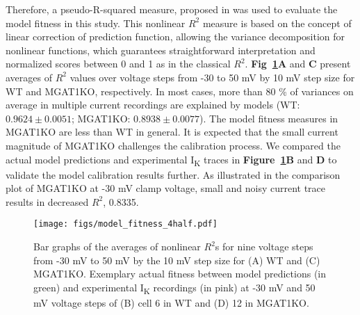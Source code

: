 \documentclass[11pt]{article}
\begin{document}
Therefore, a pseudo-R-squared measure, proposed in \citet{li2019prediction} was used to evaluate the model fitness in this study. This nonlinear $R^{2}$ measure is based on the concept of linear correction of prediction function, allowing the variance decomposition for nonlinear functions, which guarantees straightforward interpretation and normalized scores between 0 and 1 as in the classical $R^{2}$. \textbf{Fig~\ref{fig:model_fitness}A} and \textbf{C} present averages of $R^{2}$ values over voltage steps from -30 to 50 mV by 10 mV step size for WT and MGAT1KO, respectively. In most cases, more than 80 \% of variances on average in multiple current recordings are explained by models (WT: $0.9624 \pm 0.0051$; MGAT1KO: $0.8938 \pm 0.0077$). The model fitness measures in MGAT1KO are less than WT in general. It is expected that the small current magnitude of MGAT1KO challenges the calibration process. We compared the actual model predictions and experimental I\textsubscript{K} traces in \textbf{Figure~\ref{fig:model_fitness}B} and \textbf{D} to validate the model calibration results further. As illustrated in the comparison plot of MGAT1KO at -30 mV clamp voltage, small and noisy current trace results in decreased $R^{2}$, 0.8335. 
\begin{figure}[!ht]
    \centering
    \texttt{[image: figs/model\_fitness\_4half.pdf]}
    \caption{Bar graphs of the averages of nonlinear $R^{2}$s for nine voltage steps from -30 mV to 50 mV by the 10 mV step size for (A) WT and (C) MGAT1KO. Exemplary actual fitness between model predictions (in green) and experimental I\textsubscript{K} recordings (in pink) at -30 mV and 50 mV voltage steps of (B) cell 6 in WT and (D) 12 in MGAT1KO.}
    \label{fig:model_fitness}
\end{figure}
\end{document}
